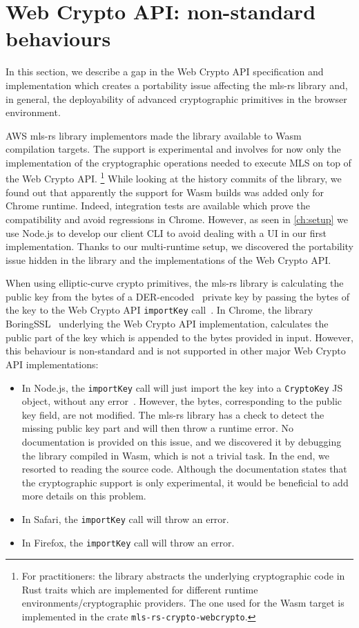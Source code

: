 \section{Web Crypto API: non-standard behaviours}\label{sc:Web-Crypto-API-implementations:-non-standard-behaviours}

In this section, we describe a gap in the Web Crypto API specification and
implementation which creates a portability issue affecting the mls-rs library
and, in general, the deployability of advanced cryptographic primitives
in the browser environment.

AWS mls-rs library implementors made the library available to Wasm compilation
targets. The support is experimental and involves for now only the implementation
of the cryptographic operations needed to execute MLS on top of the Web Crypto API.
\footnote{For practitioners: the library abstracts the underlying cryptographic code in Rust traits which are implemented for different runtime environments/cryptographic providers. The one used for the Wasm target is implemented in the crate \texttt{mls-rs-crypto-webcrypto}.}
While looking at the history commits of the library, we found out that
apparently the support for Wasm builds was added only for Chrome runtime.
Indeed, integration tests are available
which prove the compatibility and avoid regressions in Chrome.
However, as seen in \cref{ch:setup} we use Node.js to develop our client
CLI to avoid dealing with a UI in our first implementation.
Thanks to our multi-runtime setup, we discovered the portability issue
hidden in the library and the implementations of the Web Crypto API.

When using elliptic-curve crypto primitives, the mls-rs library is 
calculating the public key from the bytes of a DER-encoded~\cite{Kaliski2002ALG} private key by passing the bytes of the key to the Web Crypto API \texttt{importKey}
call~\cite{WebCryptoAPIImportKey}. In Chrome, the library BoringSSL~\cite{BoringSSL} underlying the Web Crypto API implementation, calculates
the public part of the key which is appended to the bytes provided in input.
However, this behaviour is non-standard and is not supported in other
major Web Crypto API implementations:
\begin{itemize}
    \item In Node.js, the \texttt{importKey} call will just import the key into a \texttt{CryptoKey} JS object, without any error~\cite{WebCryptoAPICryptoKey}. However, the bytes, corresponding to the public key field, are not modified. The mls-rs library has a check to detect the missing public key part and will then throw a runtime error. No documentation is provided on this issue, and we discovered it by debugging the library compiled in Wasm, which is not a trivial task. In the end, we resorted to reading the source code. Although the documentation states that the cryptographic support is only experimental, it would be beneficial to add more details on this problem.
    \item In Safari, the \texttt{importKey} call will throw an error.
    \item In Firefox, the \texttt{importKey} call will throw an error.
\end{itemize}

